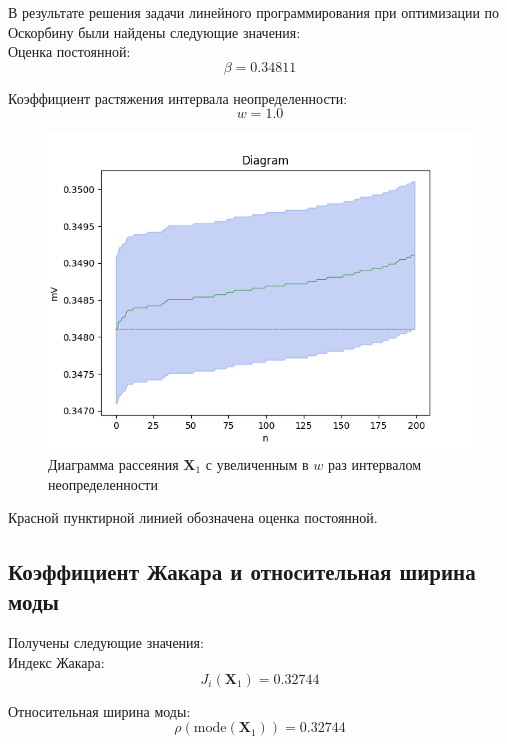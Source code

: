 \documentclass[./main.tex]{subfiles}
\begin{document}
В результате решения задачи линейного программирования при оптимизации по Оскорбину были найдены следующие значения: \\
Оценка постоянной: 
\begin{equation*}
	\beta = 0.34811
\end{equation*}

Коэффициент растяжения интервала неопределенности: 
\begin{equation*}
	w = 1.0
\end{equation*}

\begin{figure}[ht]
	\begin{center}
		\includegraphics[scale = 0.55]{../images/diagram_beta_0.3481063.png}
	\end{center}
	\caption{Диаграмма рассеяния $\bm{X}_1$ с увеличенным в $w$ раз интервалом неопределенности}
\end{figure}

Красной пунктирной линией обозначена оценка постоянной.

\subsection{Коэффициент Жакара и относительная ширина моды}

Получены следующие значения: \\
Индекс Жакара: 
\begin{equation*}
	J_i(\bm{X}_1) = 0.32744
\end{equation*}

Относительная ширина моды: 
\begin{equation*}
	\rho(\text{mode}(\bm{X}_1)) = 0.32744
\end{equation*}

\newpage
\end{document}
